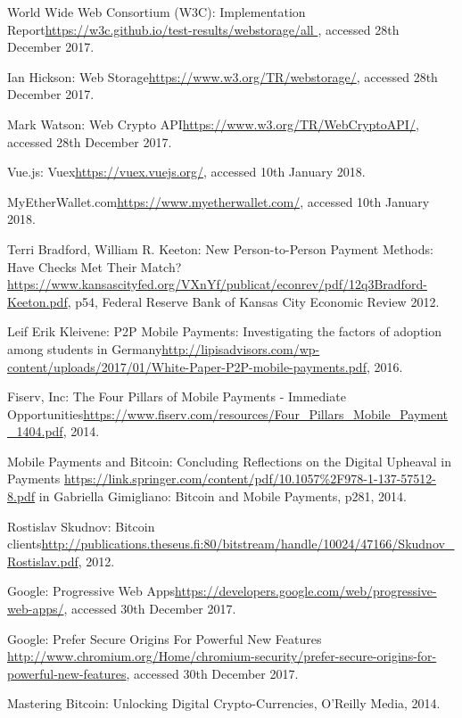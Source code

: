 \begin{thebibliography}{99}
 World Wide Web Consortium (W3C): Implementation Report\url{https://w3c.github.io/test-results/webstorage/all
}, accessed 28th December 2017.

 Ian Hickson: Web Storage\url{https://www.w3.org/TR/webstorage/}, accessed 28th December 2017.

 Mark Watson: Web Crypto API\url{https://www.w3.org/TR/WebCryptoAPI/}, accessed 28th December 2017.

 Vue.js: Vuex\url{https://vuex.vuejs.org/}, accessed 10th January 2018.

 MyEtherWallet.com\url{https://www.myetherwallet.com/}, accessed 10th January 2018.

 Terri Bradford, William R. Keeton: New Person-to-Person
Payment Methods: Have Checks Met Their Match? \url{https://www.kansascityfed.org/VXnYf/publicat/econrev/pdf/12q3Bradford-Keeton.pdf}, p54, Federal Reserve Bank of Kansas City Economic Review 2012.

 Leif Erik Kleivene: P2P Mobile Payments: Investigating the factors of adoption among students in Germany\url{http://lipisadvisors.com/wp-content/uploads/2017/01/White-Paper-P2P-mobile-payments.pdf}, 2016.

 Fiserv, Inc: The Four Pillars of Mobile Payments - Immediate Opportunities\url{https://www.fiserv.com/resources/Four_Pillars_Mobile_Payment_1404.pdf}, 2014.

Mobile Payments and Bitcoin: Concluding Reflections on the Digital Upheaval in Payments \url{https://link.springer.com/content/pdf/10.1057\%2F978-1-137-57512-8.pdf} in Gabriella Gimigliano: Bitcoin and Mobile Payments, p281, 2014.

Rostislav Skudnov: Bitcoin clients\url{http://publications.theseus.fi:80/bitstream/handle/10024/47166/Skudnov_Rostislav.pdf}, 2012.

Google: Progressive Web Apps\url{https://developers.google.com/web/progressive-web-apps/}, accessed 30th December 2017.

Google: Prefer Secure Origins For Powerful New Features \url{http://www.chromium.org/Home/chromium-security/prefer-secure-origins-for-powerful-new-features}, accessed 30th December 2017.

Mastering Bitcoin: Unlocking Digital Crypto-Currencies, O'Reilly Media, 2014.


\end{thebibliography}
